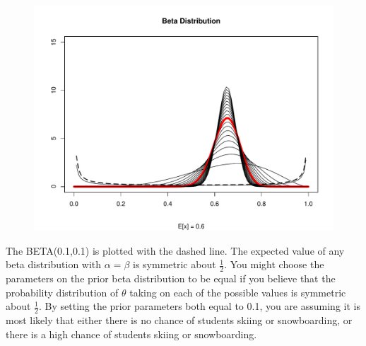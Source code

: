 \documentclass{article}\usepackage[]{graphicx}\usepackage[]{color}
\makeatletter
\def\maxwidth{ %
  \ifdim\Gin@nat@width>\linewidth
    \linewidth
  \else
    \Gin@nat@width
  \fi
}
\newenvironment{knitrout}{}{} %
\makeatother
\begin{document}
\begin{enumerate}
\begin{enumerate}
\begin{figure}[htbp]
\begin{knitrout}
\color{fgcolor}
\includegraphics[width=\maxwidth]{figure/3bx-1} 

\end{knitrout}


\end{figure}

The BETA(0.1,0.1) is plotted with the dashed line. The expected value of any beta distribution with $\alpha = \beta$ is symmetric about $\frac{1}{2}$. You might choose the parameters on the prior beta distribution to be equal if you believe that the probability distribution of $\theta$ taking on each of the possible values is symmetric about $\frac{1}{2}$. By setting the prior parameters both equal to 0.1, you are assuming it is most likely that either there is no chance of students skiing or snowboarding, or there is a high chance of students skiing or snowboarding.


\end{enumerate}
\end{enumerate}
\end{document}

